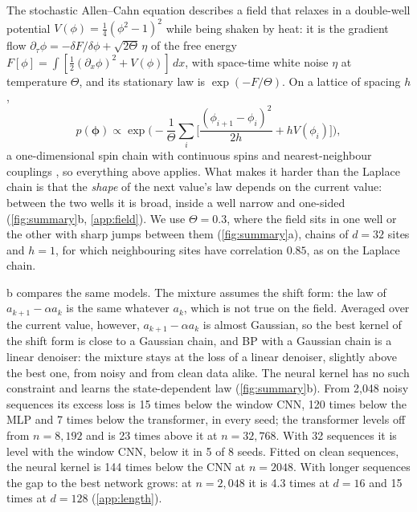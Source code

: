 \documentclass{article}
\begin{document}
The stochastic Allen--Cahn equation \cite{allen1979microscopic,dapratozabczyk2014} describes a field that relaxes in a
double-well potential $V(\phi)=\tfrac14(\phi^2-1)^2$ while being shaken by heat: it is the gradient flow
$\partial_\tau\phi=-\delta F/\delta\phi+\sqrt{2\Theta}\,\eta$ of the free energy
$F[\phi]=\int[\tfrac12(\partial_x\phi)^2+V(\phi)]\,dx$, with space-time white noise $\eta$ at temperature $\Theta$, and
its stationary law is $\exp(-F/\Theta)$. On a lattice of spacing $h$,
\begin{equation}
  p(\boldsymbol\phi)\propto\exp\Big(-\frac1\Theta\sum_i\Big[\frac{(\phi_{i+1}-\phi_i)^2}{2h}+hV(\phi_i)\Big]\Big),
  \label{eq:allen-cahn}
\end{equation}
a one-dimensional spin chain with continuous spins and nearest-neighbour couplings \cite{achilli2026speciation}, so
everything above applies. What makes it harder than the Laplace chain is that the \emph{shape} of the next value's law
depends on the current value: between the two wells it is broad, inside a well narrow and one-sided
(\cref{fig:summary}b, \cref{app:field}). We use $\Theta=0.3$, where the field sits in one well or the other with sharp
jumps between them (\cref{fig:summary}a), chains of $d=32$ sites and $h=1$, for which neighbouring sites have
correlation $0.85$, as on the Laplace chain.

b compares the same models. The mixture assumes the shift form: the law of $a_{k+1}-\alpha a_k$ is
the same whatever $a_k$, which is not true on the field. Averaged over the current value, however, $a_{k+1}-\alpha a_k$
is almost Gaussian, so the best kernel of the shift form is close to a Gaussian chain, and BP with a Gaussian chain is
a linear denoiser: the mixture stays at the loss of a linear denoiser, slightly above the best one, from noisy and from
clean data alike. The neural kernel has no such constraint and learns the
state-dependent law (\cref{fig:summary}b). From 2{,}048 noisy sequences its excess loss is 15 times below the window CNN,
120 times below the MLP and 7 times below the transformer, in every seed; the transformer levels off from $n=8{,}192$
and is 23 times above it at $n=32{,}768$. With 32 sequences it is level with the window CNN, below it in 5 of 8 seeds.
Fitted on clean sequences, the neural kernel is 144 times below the CNN at $n=2048$. With longer sequences the gap to
the best network grows: at $n=2{,}048$ it is 4.3 times at $d=16$ and 15 times at $d=128$ (\cref{app:length}).
\end{document}
